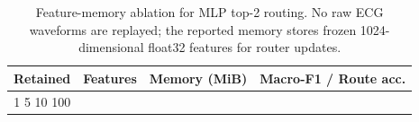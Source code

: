 \begin{table}[t]
\centering
\caption{Feature-memory ablation for MLP top-2 routing. No raw ECG waveforms are replayed; the reported memory stores frozen 1024-dimensional float32 features for router updates.}
\label{tab:feature_memory}
\small
\setlength{\tabcolsep}{3pt}
\begin{tabular}{@{}rrrr@{}}
\toprule
Retained & Features & Memory (MiB) & Macro-F1 / Route acc. \\
\midrule
1%
5%
10%
100%
\bottomrule
\end{tabular}
\end{table}

